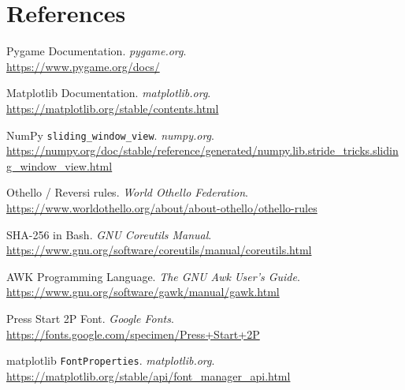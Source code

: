 \documentclass[12pt,a4paper]{article}
\begin{document}
\section{References}

 
\begin{enumerate}[leftmargin=*, label={[\arabic*]}]
  \item Pygame Documentation. \textit{pygame.org}. \\
        \url{https://www.pygame.org/docs/}
 
  \item Matplotlib Documentation. \textit{matplotlib.org}. \\
        \url{https://matplotlib.org/stable/contents.html}
 
  \item NumPy \texttt{sliding\_window\_view}. \textit{numpy.org}. \\
        \url{https://numpy.org/doc/stable/reference/generated/numpy.lib.stride_tricks.sliding_window_view.html}
 
  \item Othello / Reversi rules. \textit{World Othello Federation}. \\
        \url{https://www.worldothello.org/about/about-othello/othello-rules}
 
  \item SHA-256 in Bash. \textit{GNU Coreutils Manual}. \\
        \url{https://www.gnu.org/software/coreutils/manual/coreutils.html}
 
  \item AWK Programming Language. \textit{The GNU Awk User's Guide}. \\
        \url{https://www.gnu.org/software/gawk/manual/gawk.html}
 
  \item Press Start 2P Font. \textit{Google Fonts}. \\
        \url{https://fonts.google.com/specimen/Press+Start+2P}
 
  \item matplotlib \texttt{FontProperties}. \textit{matplotlib.org}. \\
        \url{https://matplotlib.org/stable/api/font_manager_api.html}
\end{enumerate}
 
\end{document}
